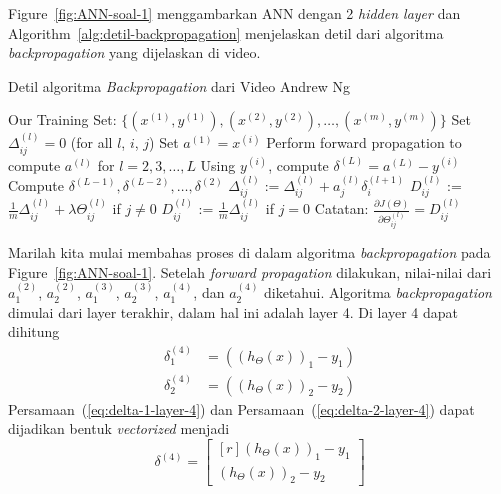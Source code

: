 \documentclass[12pt]{article}
\begin{document}
Figure~\ref{fig:ANN-soal-1} menggambarkan ANN dengan 2 \textit{hidden layer} dan Algorithm~\ref{alg:detil-backpropagation} menjelaskan detil dari algoritma \textit{backpropagation} yang dijelaskan di video.
	\begin{algorithm}[!ht]
		\caption{Detil algoritma \textit{Backpropagation} dari Video Andrew Ng}
		\label{alg:detil-backpropagation}
		\begin{algorithmic}[1] 
			\newline
			\Comment Our Training Set: $\{ (x^{(1)}, y^{(1)}), (x^{(2)}, y^{(2)}), \ldots, (x^{(m)}, y^{(m)}) \}$
			\State Set $\Delta_{ij}^{(l)} = 0$ (for all $l$, $i$, $j$)
			\State Set $a^{(1)} = x^{(i)}$
			\State Perform forward propagation to compute $a^{(l)}$ for $l=2, 3, \ldots, L$
			\State Using $y^{(i)}$, compute $\delta^{(L)} = a^{(L)} - y^{(i)}$
			\State Compute $\delta^{(L-1)}, \delta^{(L-2)}, \ldots, \delta^{(2)}$
			\State $\Delta^{(l)}_{ij} := \Delta^{(l)}_{ij} + a_j^{(l)} \delta_i^{(l+1)} $
			\EndFor 
			\State $D_{ij}^{(l)}$ := $\frac{1}{m} \Delta^{(l)}_{ij} + \lambda \Theta_{ij}^{(l)}$ if $j \neq 0$
			\State $D_{ij}^{(l)}$ := $\frac{1}{m} \Delta^{(l)}_{ij}$ if $j = 0$ \newline
			\Comment Catatan: $\frac{\partial J(\Theta)}{\partial \Theta_{ij}^{(l)}} = D_{ij}^{(l)}$
			\EndProcedure
		\end{algorithmic}
	\end{algorithm}	

Marilah kita mulai membahas proses di dalam algoritma \textit{backpropagation} pada Figure~\ref{fig:ANN-soal-1}. Setelah \textit{forward propagation} dilakukan, nilai-nilai dari $a_1^{(2)}$, $a_2^{(2)}$, $a_1^{(3)}$, $a_2^{(3)}$, $a_1^{(4)}$, dan $a_2^{(4)}$ diketahui. Algoritma \textit{backpropagation} dimulai dari layer terakhir, dalam hal ini adalah layer 4. Di layer 4 dapat dihitung
\begin{align}
	\delta_1^{(4)} &= ((h_{\Theta}(x))_1 - y_1) \label{eq:delta-1-layer-4} \\
	\delta_2^{(4)} &= ((h_{\Theta}(x))_2 - y_2)	 \label{eq:delta-2-layer-4}
\end{align}
Persamaan~(\ref{eq:delta-1-layer-4}) dan Persamaan~(\ref{eq:delta-2-layer-4}) dapat dijadikan bentuk \textit{vectorized} menjadi
\begin{equation}
	\delta^{(4)} = \begin{bmatrix}[r]
		(h_\Theta(x))_1 - y_1 \\
		(h_\Theta(x))_2 - y_2
	\end{bmatrix}
\end{equation}
\end{document}
